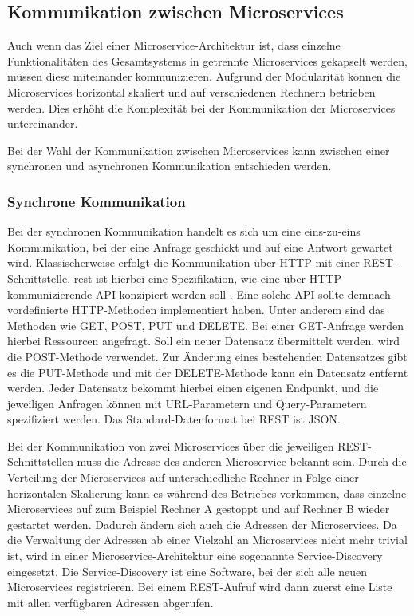 \subsection{Kommunikation zwischen Microservices\label{subsec2.2.1:Unterunterpunkt-1}}

Auch wenn das Ziel einer Microservice-Architektur ist, dass einzelne Funktionalitäten des Gesamtsystems in getrennte Microservices gekapselt werden, müssen diese miteinander kommunizieren. Aufgrund der Modularität können die Microservices horizontal skaliert und auf verschiedenen Rechnern betrieben werden. Dies erhöht die Komplexität bei der Kommunikation der Microservices untereinander. \cite{MichaelSchwab.2019}

Bei der Wahl der Kommunikation zwischen Microservices kann zwischen einer synchronen und asynchronen Kommunikation entschieden werden.

\subsubsection*{Synchrone Kommunikation}

Bei der synchronen Kommunikation handelt es sich um eine eins-zu-eins Kommunikation, bei der eine Anfrage geschickt und auf eine Antwort gewartet wird. Klassischerweise erfolgt die Kommunikation über HTTP mit einer REST-Schnittstelle. \gls{rest} ist hierbei eine Spezifikation, wie eine über HTTP kommunizierende API konzipiert werden soll \cite{MichaelSchwab.2019}. Eine solche API sollte demnach vordefinierte HTTP-Methoden implementiert haben. Unter anderem sind das Methoden wie GET, POST, PUT und DELETE. Bei einer GET-Anfrage werden hierbei Ressourcen angefragt. Soll ein neuer Datensatz übermittelt werden, wird die POST-Methode verwendet. Zur Änderung eines bestehenden Datensatzes gibt es die PUT-Methode und mit der DELETE-Methode kann ein Datensatz entfernt werden. Jeder Datensatz bekommt hierbei einen eigenen Endpunkt, und die jeweiligen Anfragen können mit URL-Parametern und Query-Parametern spezifiziert werden. Das Standard-Datenformat bei REST ist JSON.

\label{service_discovery}Bei der Kommunikation von zwei Microservices über die jeweiligen REST-Schnittstellen muss die Adresse des anderen Microservice bekannt sein. Durch die Verteilung der Microservices auf unterschiedliche Rechner in Folge einer horizontalen Skalierung kann es während des Betriebes vorkommen, dass einzelne Microservices auf zum Beispiel Rechner A gestoppt und auf Rechner B wieder gestartet werden. Dadurch ändern sich auch die Adressen der Microservices. Da die Verwaltung der Adressen ab einer Vielzahl an Microservices nicht mehr trivial ist, wird in einer Microservice-Architektur eine sogenannte Service-Discovery eingesetzt. Die Service-Discovery ist eine Software, bei der sich alle neuen Microservices registrieren. Bei einem REST-Aufruf wird dann zuerst eine Liste mit allen verfügbaren Adressen abgerufen.

